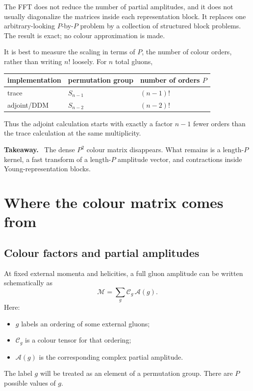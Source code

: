 \documentclass[11pt,a4paper]{article}
\newcommand{\cA}{\mathcal{A}}
\newcommand{\cC}{\mathcal{C}}
\newcommand{\cM}{\mathcal{M}}
\newenvironment{takeaway}
  {\par\medskip\noindent\begin{minipage}{\linewidth}
   \color{blue!50!black}\textbf{Takeaway.}\ \color{black}}
  {\end{minipage}\par\medskip}
\begin{document}
The FFT does not reduce the number of partial amplitudes, and it does not
usually diagonalize the matrices inside each representation block.  It
replaces one arbitrary-looking $P$-by-$P$ problem by a collection of
structured block problems.  The result is exact; no colour approximation is
made.

It is best to measure the scaling in terms of $P$, the number of colour
orders, rather than writing $n!$ loosely.  For $n$ total gluons,
\begin{center}
\begin{tabular}{lll}
  \toprule
  implementation & permutation group & number of orders $P$ \\
  \midrule
  trace & $S_{n-1}$ & $(n-1)!$ \\
  adjoint/DDM & $S_{n-2}$ & $(n-2)!$ \\
  \bottomrule
\end{tabular}
\end{center}
Thus the adjoint calculation starts with exactly a factor $n-1$ fewer orders
than the trace calculation at the same multiplicity.

\begin{takeaway}
The dense $P^2$ colour matrix disappears.  What remains is a length-$P$
kernel, a fast transform of a length-$P$ amplitude vector, and contractions
inside Young-representation blocks.
\end{takeaway}

\section{Where the colour matrix comes from}

\subsection{Colour factors and partial amplitudes}

At fixed external momenta and helicities, a full gluon amplitude can be
written schematically as
\begin{equation}
  \cM = \sum_{g} \cC_g\,\cA(g).
  \label{eq:colour-decomposition}
\end{equation}
Here:
\begin{itemize}
  \item $g$ labels an ordering of some external gluons;
  \item $\cC_g$ is a colour tensor for that ordering;
  \item $\cA(g)$ is the corresponding complex partial amplitude.
\end{itemize}
The label $g$ will be treated as an element of a permutation group.  There
are $P$ possible values of $g$.
\end{document}
